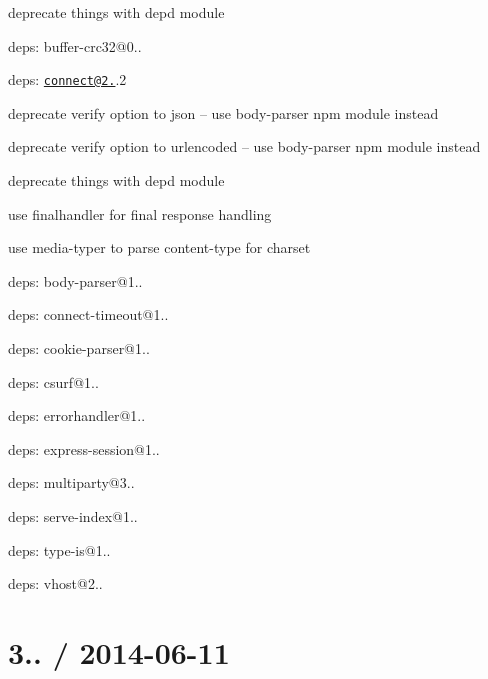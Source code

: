 {\ttfamily 
\begin{DoxyItemize}
\item deprecate things with {\ttfamily depd} module
\item deps\+: buffer-\/crc32@0..
\item deps\+: \href{mailto:connect@2.20}{\tt connect@2.}.2
\begin{DoxyItemize}
\item deprecate {\ttfamily verify} option to {\ttfamily json} -- use {\ttfamily body-\/parser} npm module instead
\item deprecate {\ttfamily verify} option to {\ttfamily urlencoded} -- use {\ttfamily body-\/parser} npm module instead
\item deprecate things with {\ttfamily depd} module
\item use {\ttfamily finalhandler} for final response handling
\item use {\ttfamily media-\/typer} to parse {\ttfamily content-\/type} for charset
\item deps\+: body-\/parser@1..
\item deps\+: connect-\/timeout@1..
\item deps\+: cookie-\/parser@1..
\item deps\+: csurf@1..
\item deps\+: errorhandler@1..
\item deps\+: express-\/session@1..
\item deps\+: multiparty@3..
\item deps\+: serve-\/index@1..
\item deps\+: type-\/is@1..
\item deps\+: vhost@2..
\end{DoxyItemize}
\end{DoxyItemize}}

{\ttfamily \section*{3.. / 2014-\/06-\/11 }}

{\ttfamily }

